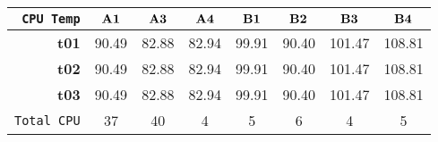 \begin{tabular}{r|ccccccc}\cline{2-8}
\tt CPU Temp&$\bf A1$&$\bf A3$&$\bf A4$&$\bf B1$&$\bf B2$&$\bf B3$&$\bf B4$\\\hline
\bf t01& 90.49& 82.88& 82.94& 99.91& 90.40& 101.47& 108.81\\
\bf t02& 90.49& 82.88& 82.94& 99.91& 90.40& 101.47& 108.81\\
\bf t03& 90.49& 82.88& 82.94& 99.91& 90.40& 101.47& 108.81\\
\hline
\tt Total CPU& 37& 40& 4& 5& 6& 4& 5\\
\end{tabular}
